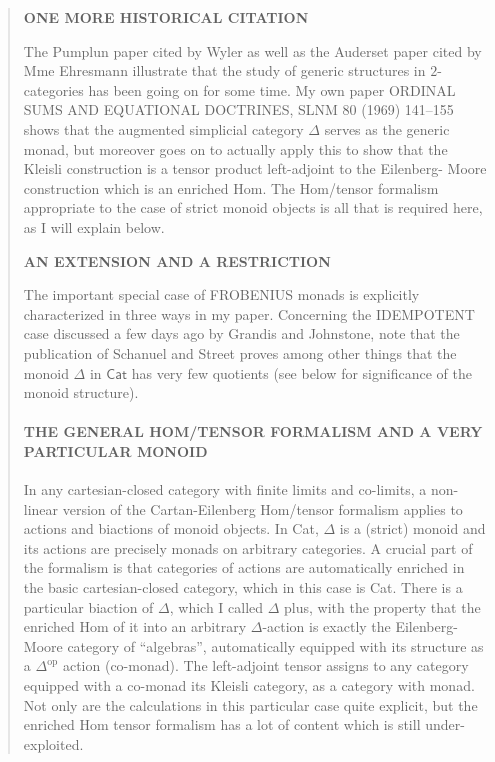\documentclass{article}
\begin{document}
\begin{quote}
\textbf{ONE MORE HISTORICAL CITATION}

The Pumplun paper cited by Wyler as well as the Auderset paper cited by
Mme Ehresmann illustrate that the study of generic structures in
\(2\)-categories has been going on for some time. My own paper ORDINAL
SUMS AND EQUATIONAL DOCTRINES, SLNM 80 (1969) 141--155 shows that the
augmented simplicial category \(\Delta\) serves as the generic monad,
but moreover goes on to actually apply this to show that the Kleisli
construction is a tensor product left-adjoint to the Eilenberg- Moore
construction which is an enriched Hom. The Hom/tensor formalism
appropriate to the case of strict monoid objects is all that is required
here, as I will explain below.

\textbf{AN EXTENSION AND A RESTRICTION}

The important special case of FROBENIUS monads is explicitly
characterized in three ways in my paper. Concerning the IDEMPOTENT case
discussed a few days ago by Grandis and Johnstone, note that the
publication of Schanuel and Street proves among other things that the
monoid \(\Delta\) in \(\mathsf{Cat}\) has very few quotients (see below
for significance of the monoid structure).

\mbox{}%
\hypertarget{the-general-homtensor-formalism-and-a-very-particular-monoid}{%
\paragraph{THE GENERAL HOM/TENSOR FORMALISM AND A VERY PARTICULAR
MONOID}\label{the-general-homtensor-formalism-and-a-very-particular-monoid}}

In any cartesian-closed category with finite limits and co-limits, a
non-linear version of the Cartan-Eilenberg Hom/tensor formalism applies
to actions and biactions of monoid objects. In Cat, \(\Delta\) is a
(strict) monoid and its actions are precisely monads on arbitrary
categories. A crucial part of the formalism is that categories of
actions are automatically enriched in the basic cartesian-closed
category, which in this case is Cat. There is a particular biaction of
\(\Delta\), which I called \(\Delta\) plus, with the property that the
enriched Hom of it into an arbitrary \(\Delta\)-action is exactly the
Eilenberg-Moore category of ``algebras'', automatically equipped with
its structure as a \(\Delta^{\mathrm{op}}\) action (co-monad). The
left-adjoint tensor assigns to any category equipped with a co-monad its
Kleisli category, as a category with monad. Not only are the
calculations in this particular case quite explicit, but the enriched
Hom tensor formalism has a lot of content which is still
under-exploited.


\end{quote}
\end{document}
